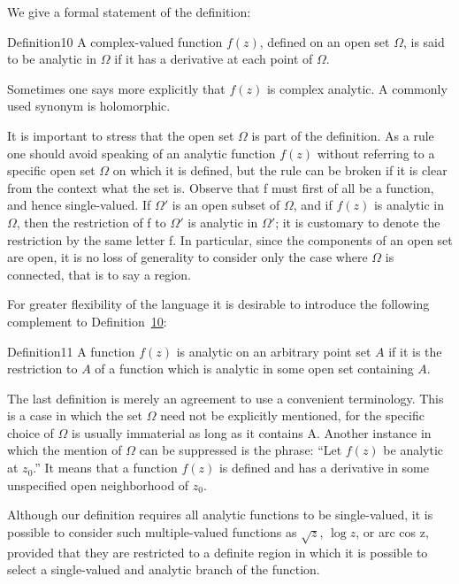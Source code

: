 We give a formal statement of the definition:

\begin{originalstatement}{Definition}{10}\label{def:3.10}
A complex-valued function $f(z)$, defined on an open set $\Omega$, is said to be analytic in $\Omega$ if it has a derivative at each point of $\Omega$.
\end{originalstatement}
Sometimes one says more explicitly that $f(z)$ is complex analytic. A commonly used synonym is holomorphic.

It is important to stress that the open set $\Omega$ is part of the definition. As a rule one should avoid speaking of an analytic function $f(z)$ without referring to a specific open set $\Omega$ on which it is defined, but the rule can be broken if it is clear from the context what the set is. Observe that f must first of all be a function, and hence single-valued. If $\Omega'$ is an open subset of $\Omega$, and if $f(z)$ is analytic in $\Omega$, then the restriction of f to $\Omega'$ is analytic in $\Omega'$; it is customary to denote the restriction by the same letter f. In particular, since the components of an open set are open, it is no loss of generality to consider only the case where $\Omega$ is connected, that is to say a region.

For greater flexibility of the language it is desirable to introduce the following complement to Definition~\hyperref[def:3.10]{10}:

\begin{originalstatement}{Definition}{11}\label{def:3.11}
A function $f(z)$ is analytic on an arbitrary point set $A$ if it is the restriction to $A$ of a function which is analytic in some open set containing $A$.
\end{originalstatement}
The last definition is merely an agreement to use a convenient terminology. This is a case in which the set $\Omega$ need not be explicitly mentioned, for the specific choice of $\Omega$ is usually immaterial as long as it contains A. Another instance in which the mention of $\Omega$ can be suppressed is the phrase: “Let $f(z)$ be analytic at $z_{0}$.” It means that a function $f(z)$ is defined and has a derivative in some unspecified open neighborhood of $z_{0}$.


Although our definition requires all analytic functions to be single-valued, it is possible to consider such multiple-valued functions as $\sqrt{z}$, $\log z$, or arc cos z, provided that they are restricted to a definite region in which it is possible to select a single-valued and analytic branch of the function.

